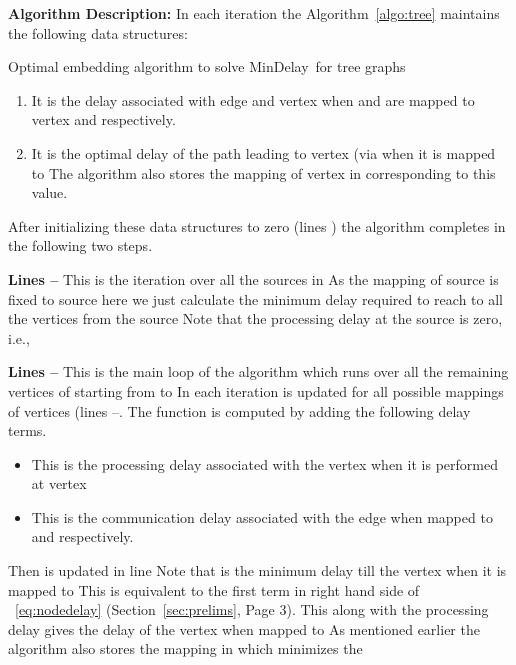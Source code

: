 \documentclass[journal]{IEEEtran}
\newcommand{\mindelay}{\textsf{MinDelay}}
\begin{document}
\textbf{Algorithm Description:} In each iteration the
Algorithm~\ref{algo:tree} maintains the following data structures: 
\begin{algorithm}
  \caption{Optimal embedding algorithm to solve \mindelay\ for tree
    graphs}
  \label{algo:tree}
 
  \begin{algorithmic} [1]
  
    \STATE  {}
    \BlankLine
    \STATE   \;
    \STATE   \; \FOR{ \KwTo }  \FORALL{}
    \STATE  \;
    \STATE  \;
    \STATE  \;
    \ENDFOR
    \ENDFOR
\FOR{ \KwTo } \FORALL{}
    \FORALL{}
    \STATE  \;
    \ENDFOR
    \STATE  \;
    \STATE  \;
    \ENDFOR
    \ENDFOR
    \STATE  \;\STATE  \;
    \FOR{ \KwTo }
    \STATE  \;
    \ENDFOR
  \end{algorithmic}
\end{algorithm}



\begin{enumerate}
\item  It is the delay associated with edge
   and vertex  when
   and  are mapped to vertex  and
   respectively.
\item  It is the optimal delay of the path leading to vertex
   (via  when it is mapped to  The algorithm also stores the mapping of vertex 
  in  corresponding to this value.
\end{enumerate}

After initializing these data structures to zero (lines ) the
algorithm completes in the following two steps.

\textbf{Lines --} This is the iteration over all the sources in
   As the mapping of source  is
  fixed to source  here we just calculate the minimum
  delay required to reach to all the vertices from the source 
  Note that the processing delay at the source is zero, i.e.,
  
  
\textbf{Lines --} This is the main loop of the algorithm which
  runs over all the remaining vertices of  starting from
   to  In each iteration  is
  updated for all possible mappings of vertices
   (lines --. The function
   is computed by adding the following delay terms.
\begin{itemize}
  \item  This is the processing delay
    associated with the vertex  when it is performed at
    vertex 
  \item 
    This is the communication delay associated with the edge
     when mapped to  and 
    respectively.
 \end{itemize}
Then  is updated in line  Note that
  is the minimum delay
 till the vertex  when it is mapped to  This is
 equivalent to the first term in right hand side of
 ~\eqref{eq:nodedelay} (Section~\ref{sec:prelims}, Page 3). This along
 with the processing delay  gives the
 delay of the vertex  when mapped to  As mentioned
 earlier the algorithm also stores the mapping  in  which
 minimizes the 
 
\end{document}

